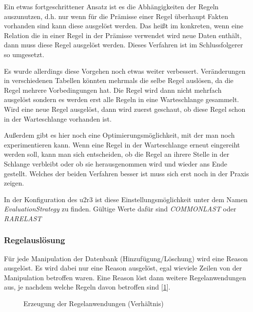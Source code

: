 Ein etwas fortgeschrittener Ansatz ist es die Abhängigkeiten der Regeln auszunutzen, d.h. nur wenn für die Prämisse einer Regel überhaupt Fakten vorhanden sind kann diese ausgelöst werden. Das heißt im konkreten, wenn eine Relation die in einer Regel in der Prämisse verwendet wird neue Daten enthält, dann muss diese Regel ausgelöst werden. Dieses Verfahren ist im Schlussfolgerer so umgesetzt.

Es wurde allerdings diese Vorgehen noch etwas weiter verbessert. Veränderungen in verschiedenen Tabellen könnten mehrmals die selbe Regel auslösen, da die Regel mehrere Vorbedingungen  hat. Die Regel wird dann nicht mehrfach ausgelöst sondern es werden erst alle Regeln in eine Warteschlange gesammelt. Wird eine neue Regel ausgelöst, dann wird zuerst geschaut, ob diese Regel schon in der Warteschlange vorhanden ist.

Außerdem gibt es hier noch eine Optimierungsmöglichkeit, mit der man noch experimentieren kann. Wenn eine Regel in der Warteschlange erneut eingereiht werden soll, kann man sich entscheiden, ob die Regel an ihrere Stelle in der Schlange verbleibt oder ob sie herausgenommen wird und wieder ans Ende gestellt. Welches der beiden Verfahren besser ist muss sich erst noch in der Praxis zeigen.

In der Konfiguration des u2r3 ist diese Einstellungsmöglichkeit unter dem Namen \emph{EvaluationStrategy} zu finden. Gültige Werte dafür sind \emph{COMMONLAST} oder \emph{RARELAST}

\subsubsection{Regelauslösung}
Für jede Manipulation der Datenbank (Hinzufügung/Löschung) wird eine Reason ausgelöst. Es wird dabei nur eine Reason ausgelöst, egal wieviele Zeilen von der Manipulation betroffen waren. Eine Reason löst dann weitere Regelanwendungen aus, je nachdem welche Regeln davon betroffen sind [\ref{diagram-ruleexecution1}].

\begin{figure}[htp]
\begin{center}
  \caption{Erzeugung der Regelanwendungen (Verhältnis)}
  \label{diagram-ruleexecution1}
\end{center}
\end{figure}

